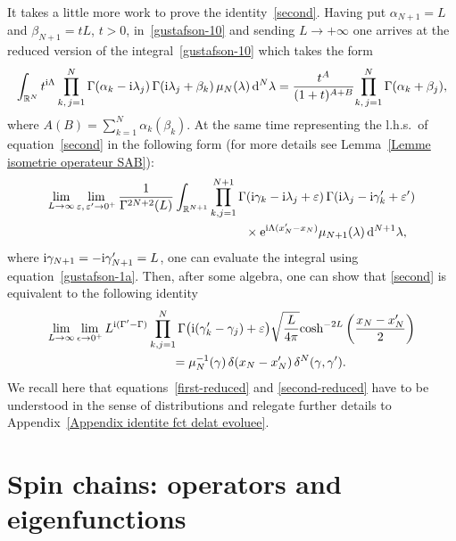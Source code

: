 \documentclass[pdftex]{sigma}%
\numberwithin{equation}{section}
\begin{document}
It takes a little more work to prove the identity~\eqref{second}. Having put $\alpha_{N+1}=L$ and $\beta_{N+1}=t L$, $t>0$,
in~\eqref{gustafson-10} and sending $L\to +\infty$ one arrives at the reduced version of the integral~\eqref{gustafson-10} which takes the
form~\cite{DMspinchainandSL2RGustafson}
\begin{gather}\label{gustafson-1a}
\int_{\mathbb R^N} t^{{\rm i}\Lambda}
\prod_{k,\,j=1}^{N} \Gamma(\alpha_k-{\rm i}\lambda_j)\,\Gamma({\rm i}\lambda_j+\beta_k)\,
\mu_N(\lambda)\, {\rm d}^N\lambda
=\frac{t^{A}}{(1+t)^{A+B}}{\prod_{k,\,j=1}^{N}\Gamma(\alpha_k+\beta_j)},
\end{gather}
where $A(B)=\sum_{k=1}^N \alpha_k(\beta_k)$. At the same time representing the l.h.s.\ of equation~\eqref{second} in the following form (for
more details see Lemma~\ref{Lemme isometrie operateur SAB}):
\begin{gather*}
\lim_{L\rightarrow\infty} \lim_{\varepsilon,\,\varepsilon'\rightarrow 0^+} \frac1{\Gamma^{{2N+2}}(L)}\int_{\mathbb R^{N+1}}
\prod_{k,j=1}^{N+1} \Gamma({\rm i} \gamma_k-{\rm i}\lambda_j+\varepsilon)\,
\Gamma({\rm i}\lambda_j-{\rm i}\gamma'_k+\varepsilon')
\\ \hphantom{\lim_{L\rightarrow\infty} \lim_{\varepsilon,\,\varepsilon'\rightarrow 0^+} \frac1{\Gamma^{{2N+2}}(L)}\int_{\mathbb R^{N+1}}
\prod_{k,j=1}^{N+1}}
{}\times{\rm e}^{{\rm i}\Lambda(x'_N-x_N)}
\mu_{N+1}(\lambda) \,{\rm d}^{N+1}\lambda,
\end{gather*}
where ${\rm i}\gamma_{N+1}=-{\rm i}\gamma'_{N+1} =L$, one can evaluate the integral using equation~\eqref{gustafson-1a}. Then, after some algebra, one can
show that \eqref{second} is equivalent to the following identity
\begin{gather}
\lim_{L\rightarrow\infty} \lim_{\epsilon\rightarrow 0^+}
L^{{\rm i}(\Gamma'-\Gamma)}\prod_{k,j=1}^{N}\Gamma\big({\rm i}(\gamma'_k-\gamma_j)+\varepsilon\big)
\sqrt{\frac{L}{4\pi}}{\cosh^{-2L}\bigg(\frac{x_N-x'_N}2\bigg)}\nonumber
 \\ \hphantom{\lim_{L\rightarrow\infty} \lim_{\epsilon\rightarrow 0^+}}
{}= {\mu^{-1}_{N}(\gamma)}
\,\delta(x_N-x'_N)\,\delta^{N}(\gamma,\gamma').\label{second-reduced}
\end{gather}
We recall here that equations~\eqref{first-reduced} and \eqref{second-reduced} have to be understood in the sense of distributions and relegate
further details to Appendix~\ref{Appendix identite fct delat evoluee}.

\section{Spin chains: operators and eigenfunctions}\label{sect:spinchains}
\end{document}
